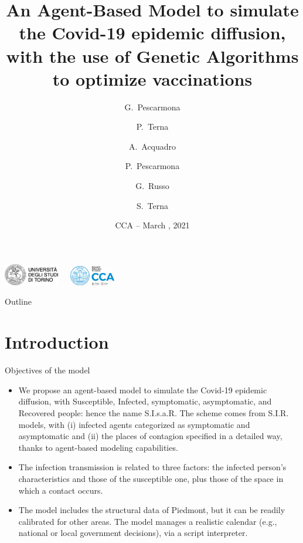 \documentclass[8pt]{beamer}
\title[S.I.s.a.R. Model] %
{An Agent-Based Model to simulate the Covid-19 epidemic diffusion, with the use of Genetic Algorithms to optimize vaccinations}
\author[] %
{G.~Pescarmona\inst{1} \and P.~Terna\inst{2} \and A.~Acquadro\inst{1} \and P.~Pescarmona\inst{3} \and G.~Russo\inst{4}  
\and S.~Terna\inst{5}  }
\institute[] %
{
  \inst{1}%
 University of Torino, Italy
  \and
  \inst{2}%
  University of Torino, Italy, retired \& Fondazione Collegio Carlo Alberto, Honorary Fellow, Italy
 \and
  \inst{3}%
  University of Groningen, The Netherlands  
  \and
  \inst{4}%
  Centro Einaudi, Torino, Italy
  \and
  \inst{5}%
 tomorrowdata.io
  }
\date[] %
{CCA -- March \nth{29}, 2021}
\begin{document}
\begin{frame}

\includegraphics[width=0.18\textwidth]{logo_unito.png}~~~\includegraphics[width=0.15\textwidth]{CCA_Logo.png}

  \titlepage
\end{frame}

\begin{frame}{Outline}
  \tableofcontents
\end{frame}

\section{Introduction}

\begin{frame}{Objectives of the model}

  \begin{itemize}
  \item
We propose an agent-based model to simulate the Covid-19 epidemic diffusion, with Susceptible, Infected, symptomatic, asymptomatic, and Recovered people: hence the name S.I.s.a.R. The scheme comes from S.I.R. models, with (i) infected agents categorized as symptomatic and asymptomatic and (ii) the places of contagion specified in a detailed way, thanks to agent-based modeling capabilities. 

 \item
The infection transmission is related to three factors: the infected person's characteristics and those of the susceptible one, plus those of the space in which a contact occurs.

 \item
The model includes the structural data of Piedmont, but it can be readily calibrated for other areas. The model manages a realistic calendar (e.g., national or local government decisions), via a script interpreter.  


 \end{itemize}
\end{frame}
\end{document}
